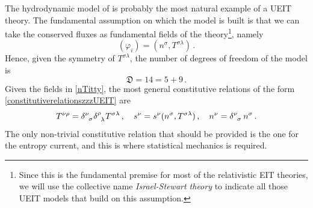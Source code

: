 \documentclass[a4paper, amsfonts, amssymb, amsmath, reprint, twocolumn, showkeys, nofootinbib]{revtex4-2}
\begin{document}
The hydrodynamic model of \citet{Israel_Stewart_1979} is probably the most natural example of a UEIT theory.
The fundamental assumption on which the model is built  is that we can take the conserved fluxes as fundamental fields of the theory\footnote{Since this is the fundamental premise for most of the relativistic EIT theories, we will use  the collective name  \textit{Israel-Stewart theory} to indicate  all those UEIT models that build on this assumption.}, namely
\begin{equation}\label{nTitty}
(\varphi_i) = (n^\sigma, T^{\sigma \lambda}) \, .
\end{equation}
Hence, given the symmetry of $T^{\sigma \lambda}$, the number of degrees of freedom of the  model is 
\begin{equation}
\mathfrak{D}=14 = 5+9 \, .
\end{equation}
Given the fields in \eqref{nTitty}, the most general constitutive relations of the form \eqref{constitutiverelationszzzUEIT} are 
\begin{equation}\label{constitIsrStew}
 T^{\nu \rho} =\delta\indices{^\nu _\sigma} \delta\indices{^\rho _\lambda}  T^{\sigma \lambda} \, ,
 \quad 
 s^\nu = s^\nu(n^\sigma, T^{\sigma \lambda}) \, , 
  \quad 
  n^\nu = \delta\indices{^\nu _\sigma} \, n^\sigma \, .
\end{equation}
The only non-trivial constitutive relation that should be provided is the one for the entropy current, and this is where statistical mechanics is required. 
\end{document}
